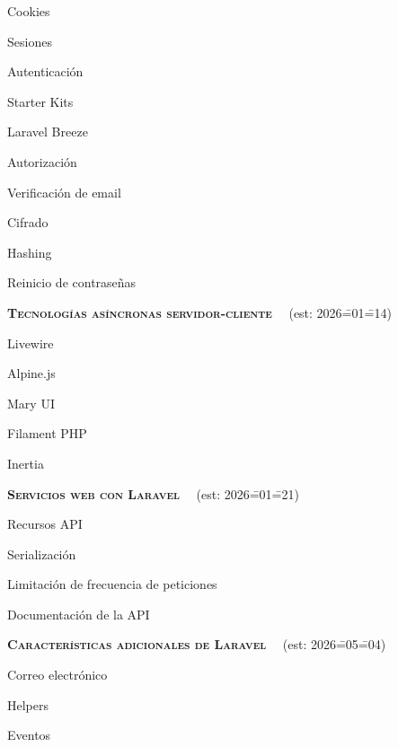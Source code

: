 \begin{longenum}
    \begin{longenum}
        \item Cookies
        \item Sesiones
        \item Autenticación
        \begin{longenum}
            \item Starter Kits
            \item Laravel Breeze
        \end{longenum}
        \item Autorización
        \item Verificación de email
        \item Cifrado
        \item Hashing
        \item Reinicio de contraseñas
    \end{longenum}
    \item \textbf{\textsc{Tecnologías asíncronas servidor-cliente}} \ \ (est: 2026\==01\==14)
    \begin{longenum}
        \item Livewire
        \begin{longenum}
            \item Alpine.js
            \item Mary UI
        \end{longenum}
        \item Filament PHP
        \item Inertia
    \end{longenum}
    \item \textbf{\textsc{Servicios web con Laravel}} \ \ (est: 2026\==01\==21)
    \begin{longenum}
        \item Recursos API
        \item Serialización
        \item Limitación de frecuencia de peticiones
        \item Documentación de la API
    \end{longenum}
    \item \textbf{\textsc{Características adicionales de Laravel}} \ \opcional\ (est: 2026\==05\==04)
    \begin{longenum}
        \item Correo electrónico
        \item Helpers
        \item Eventos

\end{longenum}
\end{longenum}
